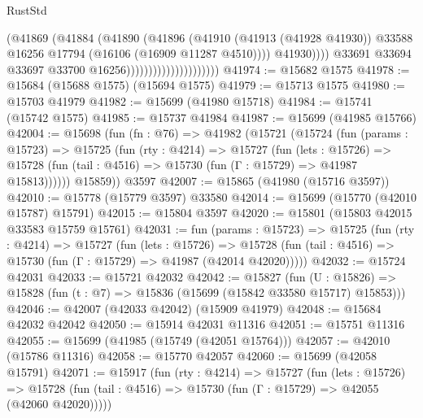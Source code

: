 \begin{lexlean}{RustStd}
\begin{coremodule}
                                                (@41869
                                                  (@41884
                                                    (@41890
                                                      (@41896
                                                        (@41910
                                                          (@41913 (@41928 @41930))
                                                          @33588
                                                          @16256
                                                          @17794
                                                          (@16106 (@16909 @11287 @4510))))
                                                      @41930))))
                                              @33691
                                              @33694
                                              @33697
                                              @33700
                                              @16256)))))))))))))))))))))
@41974 := @15682 @1575
@41978 := @15684 (@15688 @1575) (@15694 @1575)
@41979 := @15713 @1575
@41980 := @15703 @41979
@41982 := @15699 (@41980 @15718)
@41984 := @15741 (@15742 @1575)
@41985 := @15737 @41984
@41987 := @15699 (@41985 @15766)
@42004 := @15698
    (fun (fn : @76) =>
    @41982
      (@15721
        (@15724
          (fun (params : @15723) =>
          @15725
            (fun (rty : @4214) =>
            @15727
              (fun (lets : @15726) =>
              @15728 (fun (tail : @4516) => @15730 (fun (Γ : @15729) => @41987 @15813))))))
        @15859))
    @3597
@42007 := @15865 (@41980 (@15716 @3597))
@42010 := @15778 (@15779 @3597) @33580
@42014 := @15699 (@15770 (@42010 @15787) @15791)
@42015 := @15804 @3597
@42020 := @15801 (@15803 @42015 @33583 @15759 @15761)
@42031 := fun (params : @15723) =>
  @15725
    (fun (rty : @4214) =>
    @15727
      (fun (lets : @15726) =>
      @15728 (fun (tail : @4516) => @15730 (fun (Γ : @15729) => @41987 (@42014 @42020)))))
@42032 := @15724 @42031
@42033 := @15721 @42032
@42042 := @15827
    (fun (U : @15826) => @15828 (fun (t : @7) => @15836 (@15699 (@15842 @33580 @15717) @15853)))
@42046 := @42007 (@42033 @42042) (@15909 @41979)
@42048 := @15684 @42032 @42042
@42050 := @15914 @42031 @11316
@42051 := @15751 @11316
@42055 := @15699 (@41985 (@15749 (@42051 @15764)))
@42057 := @42010 (@15786 @11316)
@42058 := @15770 @42057
@42060 := @15699 (@42058 @15791)
@42071 := @15917
    (fun (rty : @4214) =>
    @15727
      (fun (lets : @15726) =>
      @15728 (fun (tail : @4516) => @15730 (fun (Γ : @15729) => @42055 (@42060 @42020)))))

\end{coremodule}
\end{lexlean}
